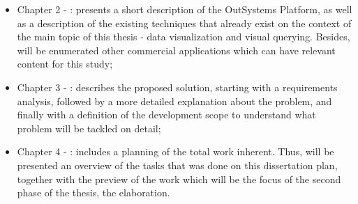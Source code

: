 \begin{itemize}
  \item Chapter 2 - : presents a short description
  of the OutSystems Platform, as well as a description of the existing techniques
  that already exist on the context of the main topic of this thesis - data visualization
  and visual querying. Besides, will be enumerated other commercial applications
  which can have relevant content for this study;
  \item Chapter 3 - : describes the proposed solution,
  starting with a requirements analysis, followed by a more detailed explanation
  about the problem, and finally with a definition of the development scope to
  understand what problem will be tackled on detail;
  \item Chapter 4 - : includes a planning
  of the total work inherent. Thus, will be presented an overview of the tasks that
  was done on this dissertation plan, together with the preview of the work which
  will be the focus of the second phase of the thesis, the elaboration.
\end{itemize}
